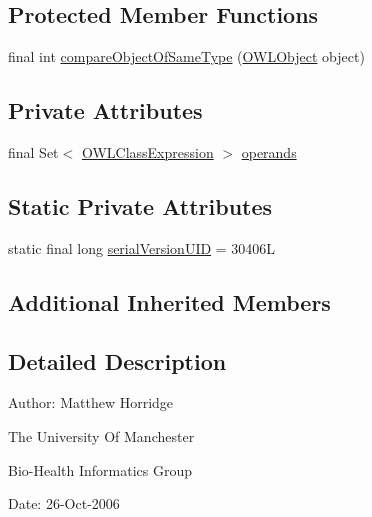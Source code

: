 \subsection*{Protected Member Functions}
\begin{DoxyCompactItemize}
\item 
final int \hyperlink{classuk_1_1ac_1_1manchester_1_1cs_1_1owl_1_1owlapi_1_1_o_w_l_nary_boolean_class_expression_impl_ae4b7cbb383b2018e5e099d2934dd845c}{compare\-Object\-Of\-Same\-Type} (\hyperlink{interfaceorg_1_1semanticweb_1_1owlapi_1_1model_1_1_o_w_l_object}{O\-W\-L\-Object} object)
\end{DoxyCompactItemize}
\subsection*{Private Attributes}
\begin{DoxyCompactItemize}
\item 
final Set$<$ \hyperlink{interfaceorg_1_1semanticweb_1_1owlapi_1_1model_1_1_o_w_l_class_expression}{O\-W\-L\-Class\-Expression} $>$ \hyperlink{classuk_1_1ac_1_1manchester_1_1cs_1_1owl_1_1owlapi_1_1_o_w_l_nary_boolean_class_expression_impl_af6e58b4bd9107f35125d03637c9dcb0f}{operands}
\end{DoxyCompactItemize}
\subsection*{Static Private Attributes}
\begin{DoxyCompactItemize}
\item 
static final long \hyperlink{classuk_1_1ac_1_1manchester_1_1cs_1_1owl_1_1owlapi_1_1_o_w_l_nary_boolean_class_expression_impl_aa5016a816c9c4304b95603c752a84c00}{serial\-Version\-U\-I\-D} = 30406\-L
\end{DoxyCompactItemize}
\subsection*{Additional Inherited Members}


\subsection{Detailed Description}
Author\-: Matthew Horridge\par
 The University Of Manchester\par
 Bio-\/\-Health Informatics Group\par
 Date\-: 26-\/\-Oct-\/2006\par
\par
 

